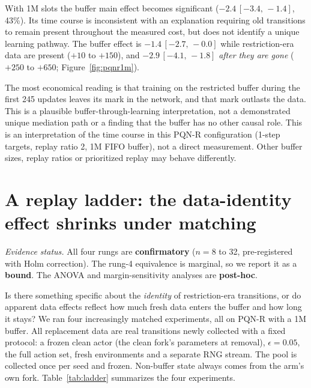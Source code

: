 \documentclass[10pt]{article} %
\newcommand{\ci}[2]{\,[#1,\,#2]}
\begin{document}
With 1M slots the buffer main effect becomes significant ($-2.4\ci{-3.4}{-1.4}$, 43\%). Its time course is inconsistent with an explanation requiring old transitions to remain present throughout the measured cost, but does not identify a unique learning pathway. The buffer effect is $-1.4\ci{-2.7}{-0.0}$ while restriction-era data are present ($+10$ to $+150$), and $-2.9\ci{-4.1}{-1.8}$ \emph{after they are gone} ($+250$ to $+650$; Figure~\ref{fig:pqnr1m}).

The most economical reading is that training on the restricted buffer during the first 245 updates leaves its mark in the network, and that mark outlasts the data. This is a plausible buffer-through-learning interpretation, not a demonstrated unique mediation path or a finding that the buffer has no other causal role. This is an interpretation of the time course in this PQN-R configuration (1-step targets, replay ratio 2, 1M FIFO buffer), not a direct measurement. Other buffer sizes, replay ratios or prioritized replay may behave differently.

\section{A replay ladder: the data-identity effect shrinks under matching}\label{sec:ladder}

\noindent\textit{Evidence status.} All four rungs are \textbf{confirmatory} ($n=8$ to 32, pre-registered with Holm correction). The rung-4 equivalence is marginal, so we report it as a \textbf{bound}. The ANOVA and margin-sensitivity analyses are \textbf{post-hoc}.

Is there something specific about the \emph{identity} of restriction-era transitions, or do apparent data effects reflect how much fresh data enters the buffer and how long it stays? We ran four increasingly matched experiments, all on PQN-R with a 1M buffer. All replacement data are real transitions newly collected with a fixed protocol: a frozen clean actor (the clean fork's parameters at removal), $\epsilon=0.05$, the full action set, fresh environments and a separate RNG stream. The pool is collected once per seed and frozen. Non-buffer state always comes from the arm's own fork. Table~\ref{tab:ladder} summarizes the four experiments.
\end{document}
